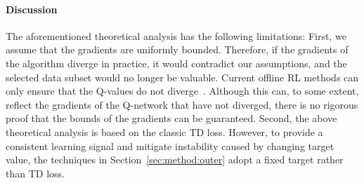 \paragraph{Discussion}
{The aforementioned theoretical analysis has the following limitations: 
First, we assume that the gradients are uniformly bounded.
Therefore, if the gradients of the algorithm diverge in practice, it would contradict our assumptions, and the selected data subset would no longer be valuable. 
Current offline RL methods can only ensure that the Q-values do not diverge~\cite{kumar2020conservative, fujimoto2021minimalist}.
Although this can, to some extent, reflect the gradients of the Q-network that have not diverged, there is no rigorous proof that the bounds of the gradients can be guaranteed. 
Second, the above theoretical analysis is based on the classic TD loss.
However, to provide a consistent learning signal and mitigate instability caused by changing target value, the techniques in Section~\ref{sec:method:outer} adopt a fixed target rather than TD loss.}

